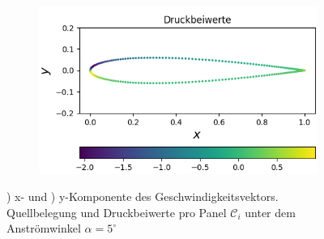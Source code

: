 \begin{figure}[!ht]
\begin{subfigure}[b]{0.475\linewidth}
    \caption{\label{fig:nacaq}}
  \end{subfigure}
  \hfill
  \begin{subfigure}[b]{0.475\linewidth}
    \centering\includegraphics[scale=0.5]{figures/nacacp.png} 
    \caption{\label{fig:nacacp}}
  \end{subfigure}
  
  \caption{) x- und ) y-Komponente des Geschwindigkeitsvektors.  Quellbelegung und  Druckbeiwerte pro Panel $\mathcal{C}_{i}$ unter dem Anströmwinkel $\alpha =5^{\circ}$}
\end{figure}

\newpage
